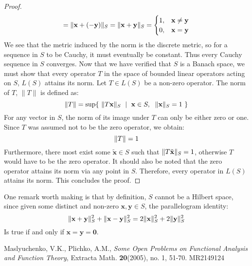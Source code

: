 \documentclass{article}
\theoremstyle{plain}
\DeclarePairedDelimiter\norm{\lVert}{\rVert}
\begin{document}
\begin{proof}
\begin{align*}
                =\norm{\mathbf{x}+(-\mathbf{y})}_{S}
                =\norm{\mathbf{x}+\mathbf{y}}_{S}
                =\begin{cases} 
                    1,&\mathbf{x}\neq\mathbf{y}\\
                    0,&\mathbf{x}=\mathbf{y}
                \end{cases}
        \end{align*}
        We see that the metric induced by the norm is the discrete metric,
        so for a sequence in $S$ to be Cauchy, it must eventually be constant.
        Thus every Cauchy sequence in $S$ converges.
        Now that we have verified that $S$ is a Banach space, we must show
        that every operator $T$ in the space of bounded linear operators
        acting on $S$, $L(S)$ attains its norm. Let $T\in L(S)$ be a
        non-zero operator. The norm of $T$, $\|T\|$ is defined as:
        \begin{equation}
            \norm{T}=\sup\{\,\,\norm{T\mathbf{x}}_{S}\,\,\;|\,\,\;
                \mathbf{x}\in S,\,\,\;\norm{\mathbf{x}}_{S}=1\,\,\}
        \end{equation}
        For any vector in $S$, the norm of its image under $T$
        can only be either zero or one. Since $T$ was assumed
        not to be the zero operator, we obtain:
        \begin{equation}
            \norm{T}=1
        \end{equation}
        Furthermore, there most exist some $\tilde{\mathbf{x}}\in S$ such that
        $\norm{T\tilde{\mathbf{x}}}_{S}=1$, otherwise $T$ would have to be
        the zero operator. It should also be noted that the zero operator
        attains its norm via any point in $S$. Therefore, every operator
        in $L(S)$ attains its norm. This concludes the proof.
    \end{proof}
    One remark worth making is that by definition, $S$ cannot be a Hilbert space,
    since given some distinct and non-zero $\mathbf{x},\mathbf{y}\in S$,
    the parallelogram identity:
    \begin{equation}
        \norm{\mathbf{x}+\mathbf{y}}_{S}^{2}+\norm{\mathbf{x}-\mathbf{y}}_{S}^{2}
        =2\norm{\mathbf{x}}_{S}^{2}+2\norm{\mathbf{y}}_{S}^{2}
    \end{equation}
    Is true if and only if $\mathbf{x}=\mathbf{y}=\mathbf{0}$.
    \begin{thebibliography}{99}
        Maslyuchenko, V.K., Plichko, A.M.,
        \emph{Some Open Problems on Functional Analysis and Function Theory},
        Extracta Math. \textbf{20}(2005), no. 1, 51-70. MR2149124
    \end{thebibliography}
\end{document}
